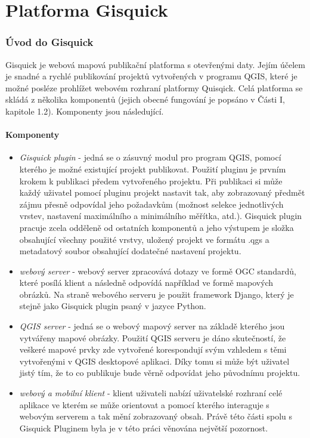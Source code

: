 \newpage
\part{Platforma Gisquick}
\newpage

\section{Úvod do Gisquick}

Gisquick je webová mapová publikační platforma s otevřenými daty. Jejím účelem je snadné a rychlé publikování projektů vytvořených v programu QGIS, které je možné posléze prohlížet webovém rozhraní platformy Quisqick. 
Celá platforma se skládá z několika komponentů (jejich obecné fungování je popsáno v Části I, kapitole 1.2). Komponenty jsou následující.

\subsection{Komponenty}

\begin{itemize}
	\item\textit{Gisquick plugin} - jedná se o zásuvný modul pro program QGIS, pomocí kterého je možné existující projekt publikovat. Použití pluginu je prvním krokem k publikaci předem vytvořeného projektu. Při publikaci si může každý uživatel pomocí pluginu projekt nastavit tak, aby zobrazovaný předmět zájmu přesně odpovídal jeho požadavkům (možnost selekce jednotlivých vrstev, nastavení maximálního a minimálního měřítka, atd.). Gisquick plugin pracuje zcela odděleně od ostatních komponentů a jeho výstupem je složka obsahující všechny použité vrstvy, uložený projekt ve formátu .qgs a metadatový soubor obsahující dodatečné nastavení projektu.
	\item\textit{webový server} - webový server zpracovává dotazy ve formě OGC standardů, které posílá klient a následně odpovídá například ve formě mapových obrázků. Na straně webového serveru je použit framework Django, který je stejně jako Gisquick plugin psaný v jazyce Python.
	\item\textit{QGIS server} - jedná se o webový mapový server na základě kterého jsou vytvářeny mapové obrázky. Použití QGIS serveru je dáno skutečností, že veškeré mapové prvky zde vytvořené korespondují svým vzhledem s těmi vytvořenými v QGIS desktopové aplikaci. Díky tomu si může být uživatel jistý tím, že to co publikuje bude věrně odpovídat jeho původnímu projektu.
	\item\textit{webový a mobilní klient} - klient uživateli nabízí uživatelské rozhraní celé aplikace ve kterém se může orientovat a pomocí kterého interaguje s webovým serverem a tak mění zobrazovaný obsah. Právě této části spolu s Gisquick Pluginem byla je v této práci věnována největší pozornost.
\end{itemize}

